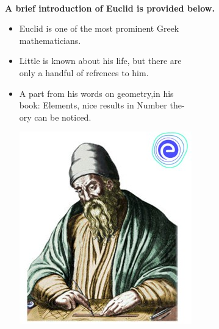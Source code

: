 \documentclass[12pt]{article}
\begin{document}
\
\begin{figure}

\textbf{A brief introduction of Euclid is provided below.}
\begin{itemize}
\item Euclid is one of the most prominent Greek\\mathematicians.\\
\item Little is known about his life, but there are\\only a handful of refrences to him.\\
\item A part from his words on geometry,in his\\book: Elements, nice results in Number the-\\ory can be noticed.

\includegraphics[scale=0.5\textwidth]{EUCLID 2}

\end{itemize}
\end{figure}
\end{document}
